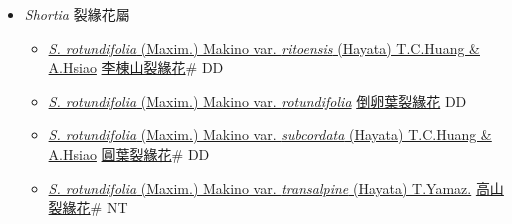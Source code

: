 
  \begin{itemize}
 \item[] \textit{Shortia} 裂緣花屬
                    
  \begin{itemize}
        \item[] \href{http://www.theplantlist.org/tpl1.1/search?q=Shortia+rotundifolia+var.+ritoensis}{\textit{S. rotundifolia} (Maxim.) Makino var. \textit{ritoensis} (Hayata) T.C.Huang \& A.Hsiao}   \href{\detokenize{http://taibnet.sinica.edu.tw/chi/taibnet_species_list.php?T2=李棟山裂緣花&T2_new_value=true&fr=y}}{李棟山裂緣花}\# DD
        \item[] \href{http://www.theplantlist.org/tpl1.1/search?q=Shortia+rotundifolia+var.+rotundifolia}{\textit{S. rotundifolia} (Maxim.) Makino var. \textit{rotundifolia}}   \href{\detokenize{http://taibnet.sinica.edu.tw/chi/taibnet_species_list.php?T2=倒卵葉裂緣花&T2_new_value=true&fr=y}}{倒卵葉裂緣花} DD
        \item[] \href{http://www.theplantlist.org/tpl1.1/search?q=Shortia+rotundifolia+var.+subcordata}{\textit{S. rotundifolia} (Maxim.) Makino var. \textit{subcordata} (Hayata) T.C.Huang \& A.Hsiao}   \href{\detokenize{http://taibnet.sinica.edu.tw/chi/taibnet_species_list.php?T2=圓葉裂緣花&T2_new_value=true&fr=y}}{圓葉裂緣花}\# DD
        \item[] \href{http://www.theplantlist.org/tpl1.1/search?q=Shortia+rotundifolia+var.+transalpine}{\textit{S. rotundifolia} (Maxim.) Makino var. \textit{transalpine} (Hayata) T.Yamaz.}   \href{\detokenize{http://taibnet.sinica.edu.tw/chi/taibnet_species_list.php?T2=高山裂緣花&T2_new_value=true&fr=y}}{高山裂緣花}\# NT
  \end{itemize}
  \end{itemize}
